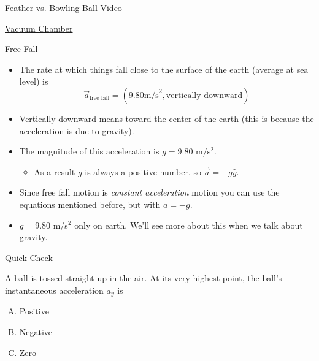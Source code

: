 \documentclass{beamer}
\newcommand{\red}[1]{{\color{red}{#1}}}
\newcommand{\checkL}[2]{\begin{textblock*}{1cm}(#1,#2){\Large \red{\Checkmark}}\end{textblock*}}
\begin{document}
\begin{frame}{Feather vs. Bowling Ball Video}
\begin{center}
   \Huge \href{https://www.youtube.com/watch?v=E43-CfukEgs}{Vacuum Chamber}
\end{center}
\end{frame}

\begin{frame}{Free Fall}
\begin{itemize}
   \item The rate at which things fall close to the surface of the earth (average at sea level) is
   \begin{equation*}
      \vec{a}_{\text{free fall}} = (9.80 \text{m/s}^2, \text{vertically downward})
   \end{equation*}
   \item<2-> Vertically downward means toward the center of the earth (this is because the acceleration is due to gravity).
   \item<3-> The magnitude of this acceleration is $g=9.80$ m/s$^2$.
   \begin{itemize}
      \item<3-> As a result $g$ is always a positive number, so $\vec{a} = -g\hat{y}$.
   \end{itemize}
   \item<4-> Since free fall motion is {\it constant acceleration} motion you can use the equations mentioned before, but with $a=-g$.
   \item<5-> $g=9.80$ m/s$^2$ only on earth. We'll see more about this when we talk about gravity.
\end{itemize}
\end{frame}

\begin{frame}{Quick Check}
\begin{center}
   A ball is tossed straight up in the air. At its very highest point, the ball's instantaneous acceleration $a_y$ is
\end{center}
\begin{enumerate}[A.]
   \item Positive
   \item Negative
   \item Zero
\end{enumerate}
\only<2->{\checkL{0.7cm}{4.6cm}}
\end{frame}
\end{document}
